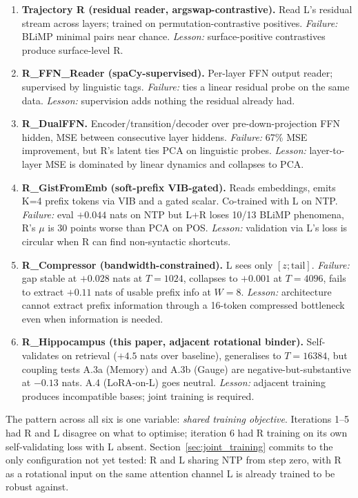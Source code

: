 \documentclass[10pt, twocolumn, a4paper]{article}
\begin{document}
\begin{enumerate}[leftmargin=1.5em]
\item \textbf{Trajectory R (residual reader, argswap-contrastive).} Read L's residual stream across layers; trained on permutation-contrastive positives. \textit{Failure:} BLiMP minimal pairs near chance. \textit{Lesson:} surface-positive contrastives produce surface-level R.
\item \textbf{R\_FFN\_Reader (spaCy-supervised).} Per-layer FFN output reader; supervised by linguistic tags. \textit{Failure:} ties a linear residual probe on the same data. \textit{Lesson:} supervision adds nothing the residual already had.
\item \textbf{R\_DualFFN.} Encoder/transition/decoder over pre-down-projection FFN hidden, MSE between consecutive layer hiddens. \textit{Failure:} 67\% MSE improvement, but R's latent ties PCA on linguistic probes. \textit{Lesson:} layer-to-layer MSE is dominated by linear dynamics and collapses to PCA.
\item \textbf{R\_GistFromEmb (soft-prefix VIB-gated).} Reads embeddings, emits K=4 prefix tokens via VIB and a gated scalar. Co-trained with L on NTP. \textit{Failure:} eval $+0.044$ nats on NTP but L+R loses 10/13 BLiMP phenomena, R's $\mu$ is 30 points worse than PCA on POS. \textit{Lesson:} validation via L's loss is circular when R can find non-syntactic shortcuts.
\item \textbf{R\_Compressor (bandwidth-constrained).} L sees only $[z; \text{tail}]$. \textit{Failure:} gap stable at $+0.028$ nats at $T=1024$, collapses to $+0.001$ at $T=4096$, fails to extract $+0.11$ nats of usable prefix info at $W=8$. \textit{Lesson:} architecture cannot extract prefix information through a 16-token compressed bottleneck even when information is needed.
\item \textbf{R\_Hippocampus (this paper, adjacent rotational binder).} Self-validates on retrieval ($+4.5$ nats over baseline), generalises to $T=16384$, but coupling tests A.3a (Memory) and A.3b (Gauge) are negative-but-substantive at $-0.13$ nats. A.4 (LoRA-on-L) goes neutral. \textit{Lesson:} adjacent training produces incompatible bases; joint training is required.
\end{enumerate}

The pattern across all six is one variable: \emph{shared training objective}. Iterations 1--5 had R and L disagree on what to optimise; iteration 6 had R training on its own self-validating loss with L absent. Section~\ref{sec:joint_training} commits to the only configuration not yet tested: R and L sharing NTP from step zero, with R as a rotational input on the same attention channel L is already trained to be robust against.
\end{document}
